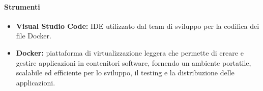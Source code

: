 \paragraph{Strumenti}
\begin{itemize}
    \item \textbf{Visual Studio Code:} IDE utilizzato dal team di sviluppo per la codifica dei file Docker.
    \item \textbf{Docker:} piattaforma di virtualizzazione leggera che permette di creare e gestire applicazioni in contenitori software, fornendo un ambiente portatile, scalabile ed efficiente per lo sviluppo, il testing e la distribuzione delle applicazioni.
\end{itemize}
